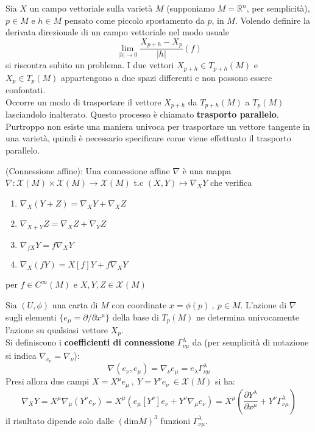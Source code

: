 Sia $X$ un campo vettoriale sulla varietà $M$ (supponiamo $M = \mathbb{R}^n$,
per semplicità), $p \in M$ e $h \in M$ pensato come piccolo spostamento da $p$, in $M$.
Volendo definire la derivata direzionale di un campo vettoriale nel modo usuale
$$
   \lim_{|h| \to 0} \frac{X_{p+h}-X_p}{|h|}(f)
$$
si riscontra subito un problema. I due vettori $X_{p+h} \in T_{p+h}(M)$ e
$X_p \in T_p(M)$ appartengono a due spazi differenti e non possono essere confontati.\\
Occorre un modo di trasportare il vettore $X_{p+h}$ da $T_{p+h}(M)$ a $T_p(M)$
lasciandolo inalterato. Questo processo è chiamato \textbf{trasporto parallelo}.
Purtroppo non esiste una maniera univoca per trasportare un vettore tangente in
una varietà, quindi è necessario specificare come viene effettuato il trasporto
parallelo.\\

\begin{definition}{(Connessione affine):}
   Una connessione affine $\nabla$ è una mappa $\nabla : \mathcal{X}(M) \times
   \mathcal{X}(M)\to \mathcal{X}(M)$ t.c $(X,Y) \mapsto \nabla_X Y$ che verifica
   \begin{enumerate}
      \item $ \nabla_X (Y+Z) = \nabla_X Y + \nabla_X Z $
      \item $ \nabla_{X+Y} Z = \nabla_X Z + \nabla_Y Z $
      \item $ \nabla_{fX} Y = f\nabla_X Y $
      \item $ \nabla_X (fY) = X[f] Y + f\nabla_X Y $
   \end{enumerate}
   per $f \in C^\infty(M)$ e $X,Y,Z \in \mathcal{X}(M)$
\end{definition}

Sia $(U,\phi)$ una carta di $M$ con coordinate $x = \phi(p) \:,\: p\in M$.
L'azione di $\nabla$ sugli elementi $\{ e_\mu = \partial/ \partial x^\mu \}$
della base di $T_p(M)$ ne determina univocamente l'azione su qualsiasi vettore $X_p$.\\

Si definiscono i \textbf{coefficienti di connessione} $\Gamma^\lambda_{\nu\mu}$ da
(per semplicità di notazione si indica $\nabla_{e_\nu} = \nabla_\nu$):
$$
   \nabla (e_\nu,e_\mu) = \nabla_\nu e_\mu =
      e_\lambda \Gamma^\lambda_{\nu\mu}
$$
Presi allora due campi $X = X^\mu e_\mu \: , \: Y = Y^\nu e_\nu \:
\in \mathcal{X}(M)$ si ha:
$$
   \nabla_X Y
      = X^\mu \nabla_\mu(Y^\nu e_\nu)
      = X^\mu(e_\mu[Y^\nu]e_\nu + Y^\nu \nabla_\mu e_\nu)
      = X^\mu \left(\frac{\partial Y^\lambda }{\partial x^\mu}
         + Y^\nu \Gamma^\lambda_{\nu\mu} \right)
$$
il risultato dipende solo dalle $(\mathrm{dim} M)^3$ funzioni $\Gamma^\lambda_{\nu\mu}$.\\

